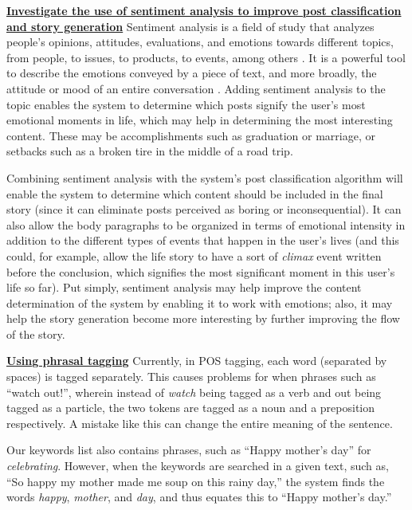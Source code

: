 \underline{\textbf{Investigate the use of sentiment analysis to improve post classification}}
\underline{\textbf{ and story generation}} \newline
Sentiment analysis is a field of study that analyzes people's opinions, attitudes, evaluations, and emotions towards different topics, from people, to issues, to products, to events, among others \cite{Liu12sentimentanalysi}. It is a powerful tool to describe the emotions conveyed by a piece of text, and more broadly, the attitude or mood of an entire conversation \cite{DBLP:journals/corr/VarolFDMF17}. Adding sentiment analysis to the topic enables the system to determine which posts signify the user's most emotional moments in life, which may help in determining the most interesting content. These may be accomplishments such as graduation or marriage, or setbacks such as a broken tire in the middle of a road trip. 

Combining sentiment analysis with the system's post classification algorithm will enable the system to determine which content should be included in the final story (since it can eliminate posts perceived as boring or inconsequential). It can also allow the body paragraphs to be organized in terms of emotional intensity in addition to the different types of events that happen in the user's lives (and this could, for example, allow the life story to have a sort of \textit{climax} event written before the conclusion, which signifies the most significant moment in this user's life so far). Put simply, sentiment analysis may help improve the content determination of the system by enabling it to work with emotions; also, it may help the story generation become more interesting by further improving the flow of the story.

\underline{\textbf{Using phrasal tagging}} \newline
Currently, in POS tagging, each word (separated by spaces) is tagged separately. This causes problems for when phrases such as ``watch out!”, wherein instead of \textit{watch} being tagged as a verb and out being tagged as a particle, the two tokens are tagged as a noun and a preposition respectively. A mistake like this can change the entire meaning of the sentence.

Our keywords list also contains phrases, such as ``Happy mother's day” for \textit{celebrating}. However, when the keywords are searched in a given text, such as, ``So happy my mother made me soup on this rainy day,” the system finds the words \textit{happy}, \textit{mother}, and \textit{day}, and thus equates this to ``Happy mother's day.”


